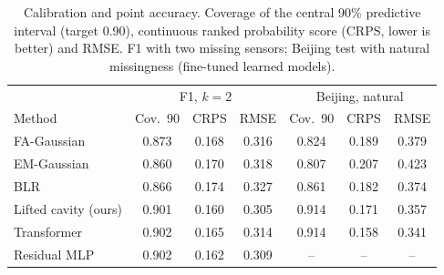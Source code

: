 \begin{table}[t]
\centering\small
\caption{\label{tab:calib}Calibration and point accuracy. Coverage of the central 90\% predictive interval (target 0.90), continuous ranked probability score (CRPS, lower is better) and RMSE. F1 with two missing sensors; Beijing test with natural missingness (fine-tuned learned models).}
\begin{tabular}{lcccccc}
\toprule
 & \multicolumn{3}{c}{F1, $k=2$} & \multicolumn{3}{c}{Beijing, natural}\\
Method & Cov.\ 90 & CRPS & RMSE & Cov.\ 90 & CRPS & RMSE\\
\midrule
FA-Gaussian & 0.873 & 0.168 & 0.316 & 0.824 & 0.189 & 0.379\\
EM-Gaussian & 0.860 & 0.170 & 0.318 & 0.807 & 0.207 & 0.423\\
BLR & 0.866 & 0.174 & 0.327 & 0.861 & 0.182 & 0.374\\
Lifted cavity (ours) & 0.901 & 0.160 & 0.305 & 0.914 & 0.171 & 0.357\\
Transformer & 0.902 & 0.165 & 0.314 & 0.914 & 0.158 & 0.341\\
Residual MLP & 0.902 & 0.162 & 0.309 & -- & -- & --\\
\bottomrule
\end{tabular}
\end{table}
